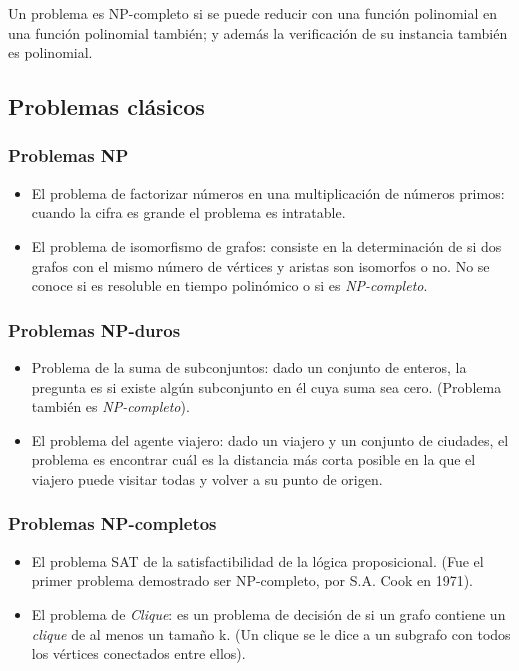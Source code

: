 \documentclass[11pt]{article}
\begin{document}
Un problema es NP-completo si se puede reducir con una función polinomial en una función polinomial también; y además la verificación de su instancia también es polinomial. 

\newpage 
\subsection{Problemas clásicos}
\subsubsection{Problemas NP}
\begin{itemize}
\item El problema de factorizar números en una multiplicación de números primos: cuando la cifra es grande el problema es intratable. 
\item El problema de isomorfismo de grafos: consiste en la determinación de si dos grafos con el mismo número de vértices y aristas son isomorfos o no. No se conoce si es resoluble en tiempo polinómico o si es \textit{NP-completo}.
\end{itemize}
\subsubsection{Problemas NP-duros}
\begin{itemize}
\item Problema de la suma de subconjuntos: dado un conjunto de enteros, la pregunta es si existe algún subconjunto en él cuya suma sea cero. (Problema también es \textit{NP-completo}).
\item El problema del agente viajero: dado un viajero y un conjunto de ciudades, el problema es encontrar cuál es la distancia más corta posible en la que el viajero puede visitar todas y volver a su punto de origen. 
\end{itemize}
\subsubsection{Problemas NP-completos}
\begin{itemize}
\item El problema SAT de la satisfactibilidad de la lógica proposicional. (Fue el primer problema demostrado ser NP-completo, por S.A. Cook en 1971).
\item El problema de \textit{Clique}: es un problema de decisión de si un grafo contiene un \textit{clique} de al menos un tamaño k. (Un clique se le dice a un subgrafo con todos los vértices conectados entre ellos).
\end{itemize}
\newpage 
\end{document}
